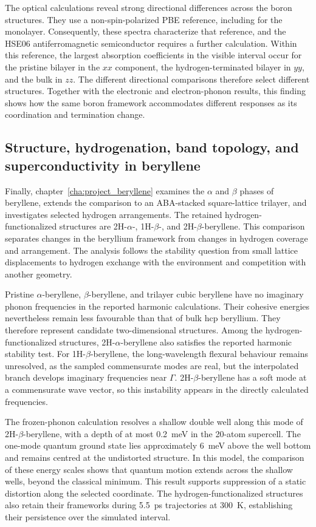 The optical calculations reveal strong directional differences across the boron structures.
They use a non-spin-polarized PBE reference, including for the monolayer.
Consequently, these spectra characterize that reference, and the HSE06 antiferromagnetic semiconductor requires a further calculation.
Within this reference, the largest absorption coefficients in the visible interval occur for the pristine bilayer in the $xx$ component, the hydrogen-terminated bilayer in $yy$, and the bulk in $zz$.
The different directional comparisons therefore select different structures.
Together with the electronic and electron-phonon results, this finding shows how the same boron framework accommodates different responses as its coordination and termination change.

\subsection{Structure, hydrogenation, band topology, and superconductivity in beryllene}

Finally, chapter~\ref{cha:project_beryllene} examines the $\alpha$ and $\beta$ phases of beryllene, extends the comparison to an ABA-stacked square-lattice trilayer, and investigates selected hydrogen arrangements.
The retained hydrogen-functionalized structures are 2H-$\alpha$-, 1H-$\beta$-, and 2H-$\beta$-beryllene.
This comparison separates changes in the beryllium framework from changes in hydrogen coverage and arrangement.
The analysis follows the stability question from small lattice displacements to hydrogen exchange with the environment and competition with another geometry.

Pristine $\alpha$-beryllene, $\beta$-beryllene, and trilayer cubic beryllene have no imaginary phonon frequencies in the reported harmonic calculations.
Their cohesive energies nevertheless remain less favourable than that of bulk hcp beryllium.
They therefore represent candidate two-dimensional structures.
Among the hydrogen-functionalized structures, 2H-$\alpha$-beryllene also satisfies the reported harmonic stability test.
For 1H-$\beta$-beryllene, the long-wavelength flexural behaviour remains unresolved, as the sampled commensurate modes are real, but the interpolated branch develops imaginary frequencies near $\Gamma$.
2H-$\beta$-beryllene has a soft mode at a commensurate wave vector, so this instability appears in the directly calculated frequencies.

The frozen-phonon calculation resolves a shallow double well along this mode of 2H-$\beta$-beryllene, with a depth of at most \qty{0.2}{\milli\electronvolt} in the 20-atom supercell.
The one-mode quantum ground state lies approximately \qty{6}{\milli\electronvolt} above the well bottom and remains centred at the undistorted structure.
In this model, the comparison of these energy scales shows that quantum motion extends across the shallow wells, beyond the classical minimum.
This result supports suppression of a static distortion along the selected coordinate.
The hydrogen-functionalized structures also retain their frameworks during \qty{5.5}{\pico\second} trajectories at \qty{300}{\kelvin}, establishing their persistence over the simulated interval.


